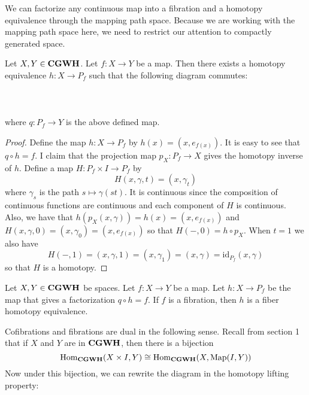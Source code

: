 \documentclass[a4paper]{article}
\begin{document}
We can factorize any continuous map into a fibration and a homotopy equivalence through the mapping path space. Because we are working with the mapping path space here, we need to restrict our attention to compactly generated space. 

\begin{thm}{}{} Let $X,Y\in\bold{CGWH}$. Let $f:X\to Y$ be a map. Then there exists a homotopy equivalence $h:X\to P_f$ such that the following diagram commutes: \\~\\
 \\~\\
where $q:P_f\to Y$ is the above defined map. \tcbline
\begin{proof}
Define the map $h:X\to P_f$ by $h(x)=(x,e_{f(x)})$. It is easy to see that $q\circ h=f$. I claim that the projection map $p_X:P_f\to X$ gives the homotopy inverse of $h$. Define a map $H:P_f\times I\to P_f$ by $$H(x,\gamma,t)=(x,\gamma_t)$$ where $\gamma_s$ is the path $s\mapsto\gamma(st)$. It is continuous since the composition of continuous functions are continuous and each component of $H$ is continuous. Also, we have that $h(p_X(x,\gamma))=h(x)=(x,e_{f(x)})$ and $H(x,\gamma,0)=(x,\gamma_0)=(x,e_{f(x)})$ so that $H(-,0)=h\circ p_X$. When $t=1$ we also have $$H(-,1)=(x,\gamma,1)=(x,\gamma_1)=(x,\gamma)=\text{id}_{P_f}(x,\gamma)$$ so that $H$ is a homotopy. 
\end{proof}
\end{thm}

\begin{prp}{}{} Let $X,Y\in\bold{CGWH}$ be spaces. Let $f:X\to Y$ be a map. Let $h:X\to P_f$ be the map that gives a factorization $q\circ h=f$. If $f$ is a fibration, then $h$ is a fiber homotopy equivalence. 
\end{prp}

Cofibrations and fibrations are dual in the following sense. Recall from section 1 that if $X$ and $Y$ are in $\bold{CGWH}$, then there is a bijection $$\operatorname{Hom}_{\bold{CGWH}}(X\times I,Y)\cong\operatorname{Hom}_{\bold{CGWH}}(X,\text{Map}(I,Y))$$ Now under this bijection, we can rewrite the diagram in the homotopy lifting property: \\~\\
\\~\\
\end{document}

